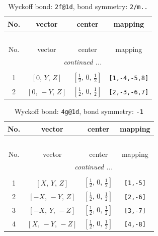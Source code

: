 \documentclass[fleqn,8pt]{jsarticle}
\begin{document}
\begin{longtable}{cccc}
\caption{Wyckoff bond: {\tt 2f@1d}, bond symmetry: {\tt 2/m..}}
 \\
 \hline \hline
No. & vector & center & mapping \\ \hline \endfirsthead

\multicolumn{3}{l}{\tablename\ \thetable{}} \\
 \hline \hline
No. & vector & center & mapping \\ \hline \endhead

 \hline \hline
\multicolumn{3}{r}{\footnotesize\it continued ...} \\ \endfoot

 \hline \hline
\multicolumn{3}{r}{} \\ \endlastfoot

1 & $\left[ 0,\, Y,\, Z \right]$ & $\left[ \frac{1}{2},\, 0,\, \frac{1}{2} \right]$ & {\tt [1,-4,-5,8]} \\ \hline
2 & $\left[ 0,\, - Y,\, Z \right]$ & $\left[ \frac{1}{2},\, 0,\, \frac{1}{2} \right]$ & {\tt [2,-3,-6,7]} \\
\end{longtable}
\renewcommand{\arraystretch}{1.2}
\begin{longtable}{cccc}
\caption{Wyckoff bond: {\tt 4g@1d}, bond symmetry: {\tt -1}}
 \\
 \hline \hline
No. & vector & center & mapping \\ \hline \endfirsthead

\multicolumn{3}{l}{\tablename\ \thetable{}} \\
 \hline \hline
No. & vector & center & mapping \\ \hline \endhead

 \hline \hline
\multicolumn{3}{r}{\footnotesize\it continued ...} \\ \endfoot

 \hline \hline
\multicolumn{3}{r}{} \\ \endlastfoot

1 & $\left[ X,\, Y,\, Z \right]$ & $\left[ \frac{1}{2},\, 0,\, \frac{1}{2} \right]$ & {\tt [1,-5]} \\ \hline
2 & $\left[ - X,\, - Y,\, Z \right]$ & $\left[ \frac{1}{2},\, 0,\, \frac{1}{2} \right]$ & {\tt [2,-6]} \\ \hline
3 & $\left[ - X,\, Y,\, - Z \right]$ & $\left[ \frac{1}{2},\, 0,\, \frac{1}{2} \right]$ & {\tt [3,-7]} \\ \hline
4 & $\left[ X,\, - Y,\, - Z \right]$ & $\left[ \frac{1}{2},\, 0,\, \frac{1}{2} \right]$ & {\tt [4,-8]} \\
\end{longtable}
\end{document}
